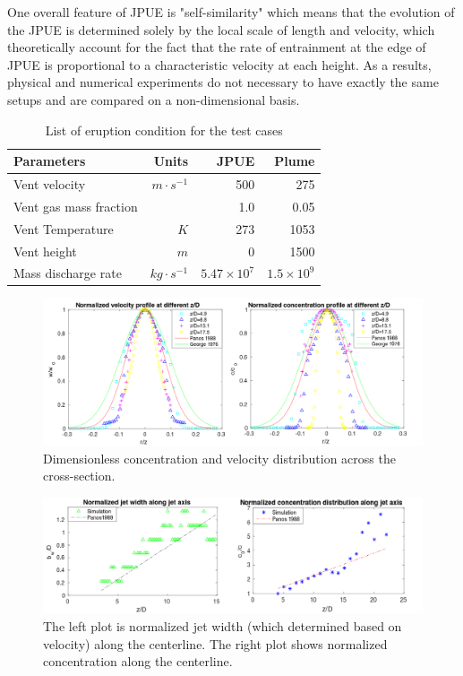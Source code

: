 \documentclass[gmd, manuscript]{copernicus}
\begin{document}
One overall feature of JPUE is "self-similarity" which means that the evolution of the JPUE is determined solely by the local scale of length and velocity, which theoretically account for the fact that the rate of entrainment at the edge of JPUE is proportional to a characteristic velocity at each height. As a results, physical and numerical experiments do not necessary to have exactly the same setups and are compared on a non-dimensional basis.

\begin{table}[htp]
	\begin{centering}
      \caption{List of eruption condition for the test cases}		
	  \begin{tabular}{lrrr}
	    \hline
	    Parameters & Units  & JPUE & Plume \\
	    \hline
	    Vent velocity          & $m\cdot s^{-1}$  & 500               & 275 \\
	    Vent gas mass fraction &                  & 1.0               & 0.05 \\
	    Vent Temperature       & $K$              & 273               & 1053 \\
	    Vent height            & $m$              & 0                 & 1500 \\
	    Mass discharge rate    & $kg\cdot s^{-1}$ & $5.47 \times 10^7$ & $1.5 \times 10^9$\\
	    \hline
	  \end{tabular}
	  \label{tab:input_parameters}
	\end{centering}
\end{table}

\begin{figure}[!htb]
    \centering
	  \includegraphics[width=16cm]{Fig7}
    \caption{Dimensionless concentration and velocity distribution across the cross-section.}
    \label{fig:JPUE_cross-section}
\end{figure}

\begin{figure}[!htb]
    \centering
	\includegraphics[width=16cm]{Fig8} 
    \caption{The left plot is normalized jet width (which determined based on velocity) along the centerline. The right plot shows normalized concentration along the centerline.}
    \label{fig:JPUE_along-axis}
\end{figure}
\end{document}
